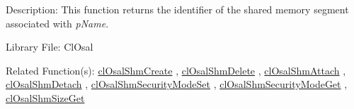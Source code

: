 \begin{Desc}
\item[Description:]This function returns the identifier of the shared memory segment associated with {\em p\-Name\/}.\end{Desc}
\begin{Desc}
\item[Library File:]Cl\-Osal\end{Desc}
\begin{Desc}
\item[Related Function(s):]\hyperlink{pageosal145}{cl\-Osal\-Shm\-Create} , \hyperlink{pageosal147}{cl\-Osal\-Shm\-Delete} ,
\hyperlink{pageosal148}{cl\-Osal\-Shm\-Attach} , \hyperlink{pageosal149}{cl\-Osal\-Shm\-Detach} , 
\hyperlink{pageosal150}{cl\-Osal\-Shm\-Security\-Mode\-Set} , \hyperlink{pageosal151}{cl\-Osal\-Shm\-Security\-Mode\-Get} , 
\hyperlink{pageosal152}{cl\-Osal\-Shm\-Size\-Get} \end{Desc}

\newpage
